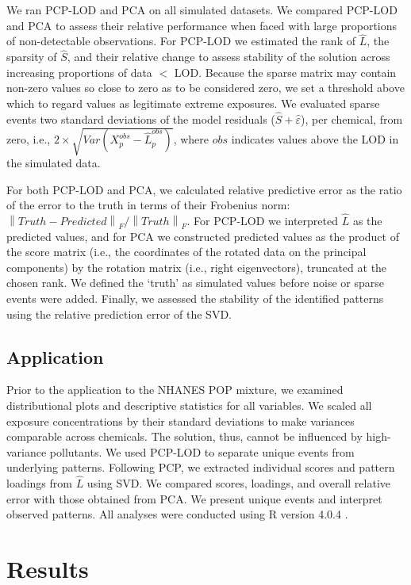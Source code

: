 We ran PCP-LOD and PCA on all simulated datasets. We compared PCP-LOD and PCA to assess their relative performance when faced with large proportions of non-detectable observations. For PCP-LOD we estimated the rank of $\hat{L}$, the sparsity of $\hat{S}$, and their relative change to assess stability of the solution across increasing proportions of data $<$ LOD. Because the sparse matrix may contain non-zero values so close to zero as to be considered zero, we set a threshold above which to regard values as legitimate extreme exposures. We evaluated sparse events two standard deviations of the model residuals ($\hat{S} + \hat{\varepsilon}$), per chemical, from zero, i.e., $2 \times \sqrt{Var(X_{p}^{obs} - \hat{L}_{p}^{obs})}$, where $obs$ indicates values above the LOD in the simulated data.

For both PCP-LOD and PCA, we calculated relative predictive error as the ratio of the error to the truth in terms of their Frobenius norm: $\left\lVert Truth - Predicted\right\rVert_F / \left\lVert  Truth\right\rVert_F$. For PCP-LOD we interpreted $\hat{L}$ as the predicted values, and for PCA we constructed predicted values as the product of the score matrix (i.e., the coordinates of the rotated data on the principal components) by the rotation matrix (i.e., right eigenvectors), truncated at the chosen rank. We defined the `truth' as simulated values before noise or sparse events were added. Finally, we assessed the stability of the identified patterns using the relative prediction error of the SVD.

\subsection{Application}
Prior to the application to the NHANES POP mixture, we examined distributional plots and descriptive statistics for all variables. We scaled all exposure concentrations by their standard deviations to make variances comparable across chemicals. The solution, thus, cannot be influenced by high-variance pollutants. We used PCP-LOD to separate unique events from underlying patterns. Following PCP, we extracted individual scores and pattern loadings from $\hat{L}$ using SVD. We compared scores, loadings, and overall relative error with those obtained from PCA. We present unique events and interpret observed patterns. All analyses were conducted using R version 4.0.4 \citep{rrr}.

\section{Results}

